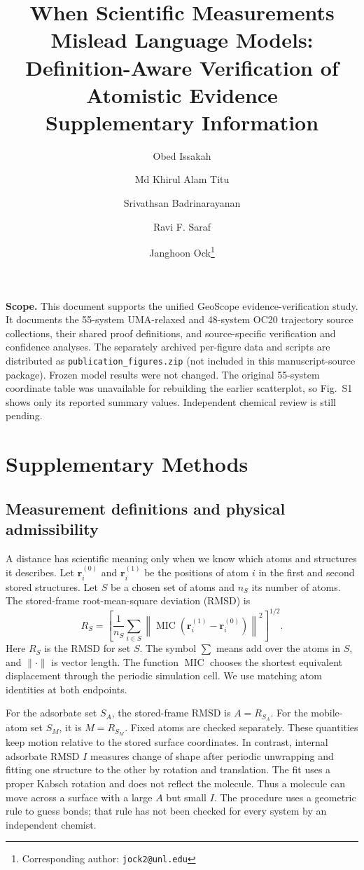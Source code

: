 \documentclass[11pt]{article}
\title{When Scientific Measurements Mislead Language Models:\\
Definition-Aware Verification of Atomistic Evidence\\[0.45em]\large Supplementary Information}
\author[1]{Obed Issakah}
\author[2]{Md Khirul Alam Titu}
\author[2]{Srivathsan Badrinarayanan}
\author[1]{Ravi F. Saraf}
\author[1]{Janghoon Ock\thanks{Corresponding author: \texttt{jock2@unl.edu}}}
\affil[1]{Department of Chemical and Biomolecular Engineering, University of Nebraska--Lincoln, Lincoln, NE 68588, USA}
\affil[2]{Department of Chemical Engineering, Carnegie Mellon University, 5000 Forbes Avenue, Pittsburgh, PA 15213, USA}
\date{}
\begin{document}
\maketitle
\noindent\textbf{Scope.} This document supports the unified GeoScope evidence-verification study. It documents the 55-system UMA-relaxed and 48-system OC20 trajectory source collections, their shared proof definitions, and source-specific verification and confidence analyses. The separately archived per-figure data and scripts are distributed as \texttt{publication\_figures.zip} (not included in this manuscript-source package). Frozen model results were not changed. The original 55-system coordinate table was unavailable for rebuilding the earlier scatterplot, so Fig.~S1 shows only its reported summary values. Independent chemical review is still pending.

\section{Supplementary Methods}
\subsection{Measurement definitions and physical admissibility}
A distance has scientific meaning only when we know which atoms and structures it describes. Let $\mathbf r_i^{(0)}$ and $\mathbf r_i^{(1)}$ be the positions of atom $i$ in the first and second stored structures. Let $S$ be a chosen set of atoms and $n_S$ its number of atoms. The stored-frame root-mean-square deviation (RMSD) is
\begin{equation}
 R_S=\left[\frac{1}{n_S}\sum_{i\in S}\left\|\operatorname{MIC}(\mathbf r_i^{(1)}-\mathbf r_i^{(0)})\right\|^2\right]^{1/2}.
 \label{eq:si_frame}
\end{equation}
Here $R_S$ is the RMSD for set $S$. The symbol $\sum$ means add over the atoms in $S$, and $\|\cdot\|$ is vector length. The function $\operatorname{MIC}$ chooses the shortest equivalent displacement through the periodic simulation cell. We use matching atom identities at both endpoints.

For the adsorbate set $S_A$, the stored-frame RMSD is $A=R_{S_A}$. For the mobile-atom set $S_M$, it is $M=R_{S_M}$. Fixed atoms are checked separately. These quantities keep motion relative to the stored surface coordinates. In contrast, internal adsorbate RMSD $I$ measures change of shape after periodic unwrapping and fitting one structure to the other by rotation and translation. The fit uses a proper Kabsch rotation and does not reflect the molecule.\cite{kabsch1978discussion} Thus a molecule can move across a surface with a large $A$ but small $I$. The procedure uses a geometric rule to guess bonds; that rule has not been checked for every system by an independent chemist.
\end{document}
